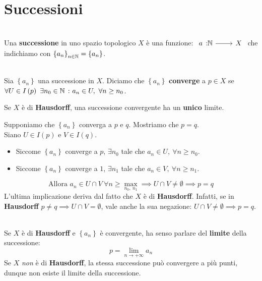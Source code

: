 \section{Successioni}
\begin{define}[Successione.]~{}\\
Una \textbf{successione} in uno spazio topologico $X$ è una funzione:
$\funz{a}{\naturalset}{X}$ che indichiamo con $\left\{a_n\right\}_{n\in\mathbb{N}}=\left\{a_n\right\}$.
\end{define}
\begin{define}~{}\\
Sia $\left\{a_n\right\}$ una successione in $X$. Diciamo che $\left\{a_n\right\}$ \textbf{converge} a $p\in X$ se $\forall U\in I\left(p\right)\ \exists n_0\in \mathbb{N}\ \colon a_n\in U,\ \forall n\geq n_0$.
\end{define}
\begin{observe}
	Se $X$ è di \textbf{Hausdorff}, una successione convergente ha un \textbf{unico} limite.
\end{observe}
\begin{demonstration}
	Supponiamo che $\left\{a_n\right\}$ converga a $p$ e $q$. Mostriamo che $p=q$.\\
	Siano $U\in I\left(p\right)$ e $V\in I\left(q\right)$.
	\begin{itemize}
		\item Siccome $\left\{a_n\right\}$ converge a $p$, $\exists n_0$ tale che $a_n\in U,\ \forall n\geq n_0$.
		\item Siccome $\left\{a_n\right\}$ converge a $1$, $\exists n_1$ tale che $a_n\in V,\ \forall n\geq n_1$.
	\end{itemize}
\begin{equation*}
\text{Allora } a_n\in U\cap V\ \forall n\geq \max_{n_0,\ n_1}\implies U\cap V\neq \emptyset\implies p=q
\end{equation*}
L'ultima implicazione deriva dal fatto che $X$ è di \textbf{Hausdorff}. Infatti, se in \textbf{Hausdorff} $p\neq q\implies U\cap V = \emptyset$, vale anche la sua negazione: $U\cap V\neq \emptyset\implies p = q$.
\end{demonstration}
\begin{define}[Limite.]~{}\\
Se $X$ è di \textbf{Hausdorff} e $\left\{a_n\right\}$ è convergente, ha senso parlare del \textbf{limite} della successione:
\begin{equation}
p=\lim_{n \to +\infty}a_n
\end{equation}
Se $X$ \textit{non} è di \textbf{Hausdorff}, la stessa successione può convergere a più punti, dunque non esiste il limite della successione.
\end{define}
